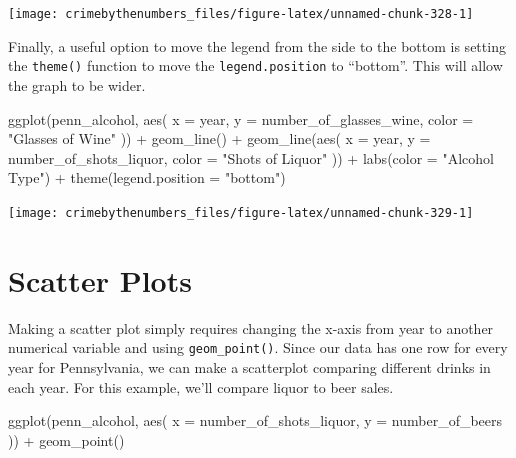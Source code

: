 \documentclass[
]{krantz}
\makeatletter
\newenvironment{Shaded}{\begin{snugshade}}{\end{snugshade}}
\newcommand{\AttributeTok}[1]{\textcolor[rgb]{0.61,0.61,0.61}{#1}}
\newcommand{\FunctionTok}[1]{\textcolor[rgb]{0,0,0}{#1}}
\newcommand{\NormalTok}[1]{#1}
\newcommand{\SpecialCharTok}[1]{\textcolor[rgb]{0,0,0}{#1}}
\newcommand{\StringTok}[1]{\textcolor[rgb]{0.5,0.5,0.5}{#1}}
\newenvironment{kframe}{%
\medskip{}
\setlength{\fboxsep}{.8em}
 \def\at@end@of@kframe{}%
 \ifinner\ifhmode%
  \def\at@end@of@kframe{\end{minipage}}%
  \begin{minipage}{\columnwidth}%
 \fi\fi%
 \def\FrameCommand##1{\hskip\@totalleftmargin \hskip-\fboxsep
 \colorbox{shadecolor}{##1}\hskip-\fboxsep
     \hskip-\linewidth \hskip-\@totalleftmargin \hskip\columnwidth}%
 \MakeFramed {\advance\hsize-\width
   \@totalleftmargin\z@ \linewidth\hsize
   \@setminipage}}%
 {\par\unskip\endMakeFramed%
 \at@end@of@kframe}
\renewenvironment{Shaded}{\begin{kframe}}{\end{kframe}}
\makeatother
\begin{document}
\begin{center}\texttt{[image: crimebythenumbers\_files/figure-latex/unnamed-chunk-328-1]} \end{center}

Finally, a useful option to move the legend from the side to
the bottom is setting the \texttt{theme()} function to move
the \texttt{legend.position} to ``bottom''. This will allow
the graph to be wider.

\begin{Shaded}
\begin{Highlighting}[]
\FunctionTok{ggplot}\NormalTok{(penn\_alcohol, }\FunctionTok{aes}\NormalTok{(}
  \AttributeTok{x =}\NormalTok{ year,}
  \AttributeTok{y =}\NormalTok{ number\_of\_glasses\_wine,}
  \AttributeTok{color =} \StringTok{"Glasses of Wine"}
\NormalTok{)) }\SpecialCharTok{+}
  \FunctionTok{geom\_line}\NormalTok{() }\SpecialCharTok{+}
  \FunctionTok{geom\_line}\NormalTok{(}\FunctionTok{aes}\NormalTok{(}
    \AttributeTok{x =}\NormalTok{ year,}
    \AttributeTok{y =}\NormalTok{ number\_of\_shots\_liquor,}
    \AttributeTok{color =} \StringTok{"Shots of Liquor"}
\NormalTok{  )) }\SpecialCharTok{+}
  \FunctionTok{labs}\NormalTok{(}\AttributeTok{color =} \StringTok{"Alcohol Type"}\NormalTok{) }\SpecialCharTok{+}
  \FunctionTok{theme}\NormalTok{(}\AttributeTok{legend.position =} \StringTok{"bottom"}\NormalTok{)}
\end{Highlighting}
\end{Shaded}

\begin{center}\texttt{[image: crimebythenumbers\_files/figure-latex/unnamed-chunk-329-1]} \end{center}

\hypertarget{scatter-plots}{%
\section{Scatter Plots}\label{scatter-plots}}

Making a scatter plot simply requires changing the x-axis
from year to another numerical variable and using
\texttt{geom\_point()}. Since our data has one row for every
year for Pennsylvania, we can make a scatterplot comparing
different drinks in each year. For this example, we'll
compare liquor to beer sales.

\begin{Shaded}
\begin{Highlighting}[]
\FunctionTok{ggplot}\NormalTok{(penn\_alcohol, }\FunctionTok{aes}\NormalTok{(}
  \AttributeTok{x =}\NormalTok{ number\_of\_shots\_liquor,}
  \AttributeTok{y =}\NormalTok{ number\_of\_beers}
\NormalTok{)) }\SpecialCharTok{+}
  \FunctionTok{geom\_point}\NormalTok{()}
\end{Highlighting}
\end{Shaded}
\end{document}
